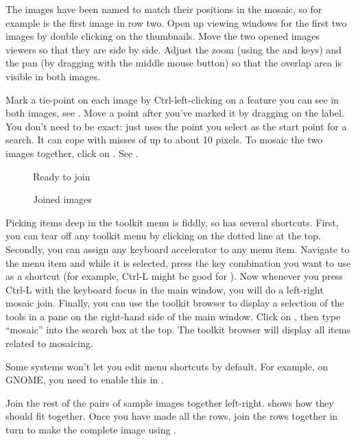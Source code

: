 The images have been named to match their positions in the mosaic, so for
example  is the first image in row two.  Open up viewing windows
for the first two images by double clicking on the thumbnails.
Move the two opened images viewers so that they are side by side. Adjust
the zoom (using the  and  keys) and the pan (by dragging with the
middle mouse button) so that the overlap
area is visible in both images.

Mark a tie-point on each image by Ctrl-left-clicking on a feature you can see
in both images, see . Move a point after you've marked it
by dragging on the label. You don't need to be exact: \nip{} just uses the
point you select as the start point for a search. It can cope with
misses of up to about 10 pixels. To mosaic the two images together, click
on . 
See .

\begin{figure}
\caption{Ready to join}
\end{figure}

\begin{figure}
\caption{Joined images}
\end{figure}

Picking items deep in the toolkit menu is fiddly, so \nip{} has several
shortcuts.  First, you can tear off any toolkit menu by clicking on the dotted
line at the top. Secondly,
you can assign any keyboard accelerator to any menu item. Navigate to the
menu item and while it is selected, press the key combination you want to use
as a shortcut (for example, Ctrl-L might be good for ). Now whenever you press Ctrl-L with the keyboard
focus in the main window, you will do a left-right mosaic join. Finally, you
can use the toolkit browser to display a selection of the tools in a pane on
the right-hand side of the main window. Click on , then type ``mosaic'' into the search box at the top. The toolkit
browser will display all items related to mosaicing.

Some systems won't let you edit menu shortcuts by default. For example,
on GNOME, you need to enable this in .

Join the rest of the pairs of sample images together
left-right.  shows how they should fit together. Once you
have made all the rows, join the rows together in turn to make the complete
image using \ct{}. 

